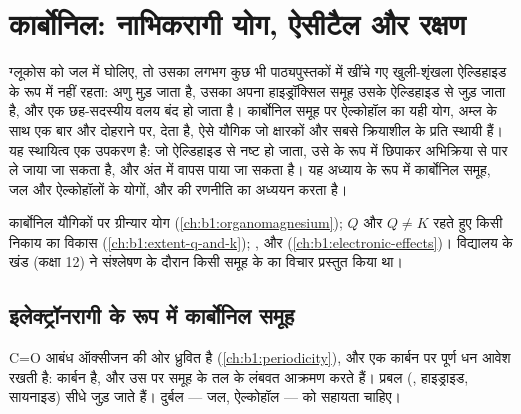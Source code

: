 \chapter{कार्बोनिल: नाभिकरागी योग, ऐसीटैल और रक्षण}\label{ch:b1:acetals-protection}

ग्लूकोस को जल में घोलिए, तो उसका लगभग कुछ भी पाठ्यपुस्तकों में खींचे गए खुली-शृंखला
ऐल्डिहाइड के रूप में नहीं रहता: अणु मुड़ जाता है, उसका अपना हाइड्रॉक्सिल
समूह उसके ऐल्डिहाइड से जुड़ जाता है, और एक छह-सदस्यीय वलय बंद हो जाता है। कार्बोनिल
समूह पर ऐल्कोहॉल का यही योग, अम्ल  के साथ एक बार और दोहराने पर,
 देता है, ऐसे यौगिक जो क्षारकों और सबसे
क्रियाशील  के प्रति स्थायी हैं। यह स्थायित्व एक उपकरण है: जो ऐल्डिहाइड
 से नष्ट हो जाता, उसे  के रूप में छिपाकर
अभिक्रिया से पार ले जाया जा सकता है, और अंत में वापस पाया जा सकता है। यह अध्याय
 के रूप में कार्बोनिल समूह, जल और ऐल्कोहॉलों के योगों,
और  की रणनीति का अध्ययन करता है।

\begin{recall}
कार्बोनिल यौगिकों पर ग्रीन्यार योग (\cref{ch:b1:organomagnesium});
 $Q$ और $Q \neq K$ रहते हुए किसी निकाय का विकास
(\cref{ch:b1:extent-q-and-k}); ,  और
 (\cref{ch:b1:electronic-effects})। विद्यालय के खंड (कक्षा
12) ने संश्लेषण के दौरान किसी समूह के  का विचार प्रस्तुत किया था।
\end{recall}

\section{इलेक्ट्रॉनरागी के रूप में कार्बोनिल समूह}

C=O आबंध ऑक्सीजन की ओर ध्रुवित है (\cref{ch:b1:periodicity}), और
एक   कार्बन पर पूर्ण धन आवेश रखती है:
कार्बन  है, और  उस पर समूह के तल के लंबवत
आक्रमण करते हैं। प्रबल  (, हाइड्राइड,
सायनाइड) सीधे जुड़ जाते हैं। दुर्बल  --- जल, ऐल्कोहॉल --- को सहायता चाहिए।

